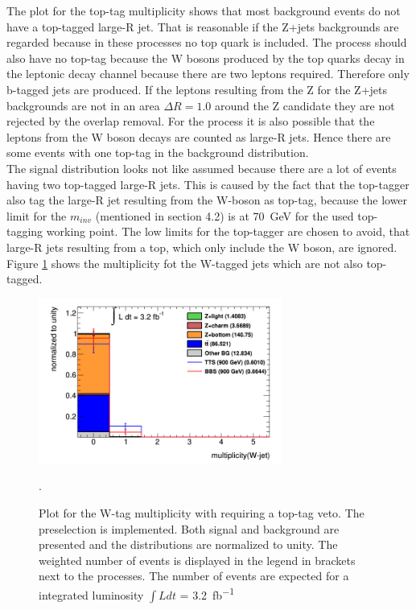 The plot for the top-tag multiplicity shows that most background events do not have a top-tagged large-R jet.
That is reasonable if the Z+jets backgrounds are regarded because in these processes no top quark is included. 
The \ttbar{} process should also have no top-tag because the W bosons produced by the top quarks decay in the leptonic decay channel because there are two leptons required.
Therefore only  b-tagged jets are produced.
If the leptons resulting from the Z for the Z+jets backgrounds are not in an area $\Delta R = 1.0$ around the Z candidate they are not rejected by the overlap removal.
For the \ttbar{} process it is also possible that the leptons from the W boson decays are counted as large-R jets.
Hence there are some events with one top-tag in the background distribution.\\
The signal distribution looks not like assumed because there are a lot of events having two top-tagged large-R jets.
This is caused by the fact that the top-tagger also tag the large-R jet resulting from the W-boson as top-tag, because the lower limit for the $m_{inv}$ (mentioned in section 4.2) is at \SI{70}{GeV} for the used top-tagging working point.
The low limits for the top-tagger are chosen to avoid, that large-R jets resulting from a top, which only include the W boson, are ignored.
Figure \ref{topobosontag} shows the multiplicity fot the W-tagged jets which are not also top-tagged.

\begin{figure}[h!]
\centering
\includegraphics[width=8cm]{figures/Wotoptag.png}
\caption{Plot for the W-tag multiplicity with requiring a top-tag veto. The preselection is implemented. 
Both signal and background are presented and the distributions are normalized to unity. 
The weighted number of events is displayed in the legend in brackets next to the processes. 
The number of events are expected for a integrated luminosity $\int L dt$ = \SI{3.2}{fb^{-1}}}.
\label{topobosontag}
\end{figure}

